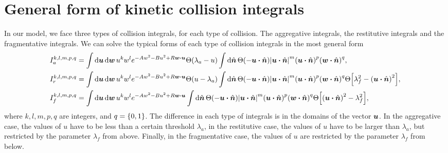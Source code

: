 \documentclass[aps,prl,preprint,groupedaddress,10pt]{revtex4-2}
\begin{document}
\section{General form of kinetic collision integrals}
In our model, we face three types of collision integrals, for each type of collision.
The aggregative integrals, the restitutive integrals and the fragmentative integrals.
We can solve the typical forms of each type of collision integrals in the most general form
\begin{equation}
    \begin{split}
        I_a^{k,l,m,p,q} &= \int\dd{\bu}\dd{\bw}u^kw^{l}
        e^{-Aw^2-Bu^2+R\bw\vdot\bu}\Theta\pqty{\lambda_a-u}
        \int\dd{\bn}\Theta\pqty{-\bu\vdot\bn}\abs{\bu\vdot\bn}^m
        \pqty{\bu\vdot\bn}^p\pqty{\bw\vdot\bn}^q,\\
        I_r^{k,l,m,p,q} &= \int\dd{\bu}\dd{\bw}u^kw^{l}
        e^{-Aw^2-Bu^2+R\bw\vdot\bu}\Theta\pqty{u-\lambda_a}
        \int\dd{\bn}\Theta\pqty{-\bu\vdot\bn}\abs{\bu\vdot\bn}^m
        \pqty{\bu\vdot\bn}^p\pqty{\bw\vdot\bn}^q
        \Theta\bqty{\lambda_f^2-\pqty{\bu\vdot\bn}^2},\\
        I_f^{k,l,m,p,q} &= \int\dd{\bu}\dd{\bw}u^kw^{l}
        e^{-Aw^2-Bu^2+R\bw\vdot\bu}
        \int\dd{\bn}\Theta\pqty{-\bu\vdot\bn}\abs{\bu\vdot\bn}^m
        \pqty{\bu\vdot\bn}^p\pqty{\bw\vdot\bn}^q
        \Theta\bqty{\pqty{\bu\vdot\bn}^2-\lambda_f^2},\\
    \end{split}
\end{equation}
where $k,l,m,p,q$ are integers, and $q=\Bqty{0,1}$. The difference in each type of
integrals is in the domains of the vector $\vb*{u}$. In the aggregative case, the values of
$u$ have to be less than a certain threshold $\lambda_a$, in the restitutive case, the
values of $u$ have to be larger than $\lambda_a$, but restricted by the parameter
$\lambda_f$ from above. Finally, in the fragmentative case, the values of $u$ are restricted
by the parameter $\lambda_f$ from below.
\end{document}
